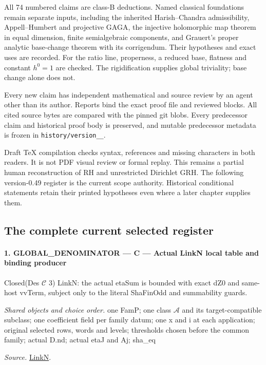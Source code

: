 \documentclass[11pt,a4paper]{article}
\numberwithin{equation}{section}
\theoremstyle{remark}\newtheorem{remark}[theorem]{Remark}
\begin{document}
All 74 numbered claims are class-B deductions. Named classical
foundations remain separate inputs, including the inherited
Harish--Chandra admissibility, Appell--Humbert and projective GAGA,
the injective holomorphic map theorem in equal dimension, finite
semialgebraic components, and Grauert's proper analytic base-change
theorem with its corrigendum. Their hypotheses and exact uses are
recorded. For the ratio line, properness, a reduced base, flatness
and constant \(h^0=1\) are checked. The rigidification supplies
global triviality; base change alone does not.

Every new claim has independent mathematical and source review by
an agent other than its author. Reports bind the exact proof file
and reviewed blocks. All cited source bytes are compared with the
pinned git blobs. Every predecessor claim and historical proof body
is preserved, and mutable predecessor metadata is frozen in
\texttt{history/\allowbreak version\_\_}.

Draft TeX compilation checks syntax, references and missing characters
in both readers. It is not PDF visual review or formal replay.
This remains a partial human reconstruction of RH and unrestricted
Dirichlet GRH. The following version-0.49 register is the current
scope authority. Historical conditional statements retain their
printed hypotheses even where a later chapter supplies them.

\subsection{The complete current selected register}

\paragraph{1. GLOBAL\_\allowbreak DENOMINATOR — C — Actual LinkN local table and binding producer}

Closed(Des $\mathcal C$ 3) LinkN: the actual etaSum is bounded with exact dZ0 and same-host vvTerm, subject only to the literal ShaFinOdd and summability guards.

\emph{Shared objects and choice order.} one FamP; one class $\mathcal A$ and its target-compatible subclass; one coefficient field per family datum; one x and i at each application; original selected rows, words and levels; thresholds chosen before the common family; actual D.nd; actual etaJ and Aj; sha\_\allowbreak eq

\emph{Source.} \href{https://github.com/CocoSgt/riemann-hypothesis-lean/blob/7cbf7a0c32fca1badf05931879a37c3f8a2b03b4/src/Formalism/SharpRestriction/GlobalTheoremInputs.lean#L45-L48}{LinkN}.
\end{document}

